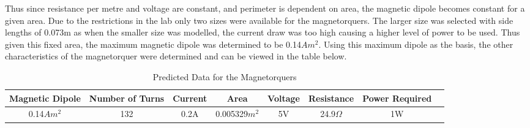 Thus since resistance per metre and voltage are constant, and perimeter is dependent on area, the magnetic dipole becomes constant for a given area.  Due to the restrictions in the lab only two sizes were available for the magnetorquers. The larger size was selected with side lengths of 0.073m as when the smaller size was modelled, the current draw was too high causing a higher level of power to be used.  Thus given this fixed area, the maximum magnetic dipole was determined to be  0.14$Am^2$.  Using this maximum dipole as the basis, the other characteristics of the magnetorquer were determined and can be viewed in the table below.
\begin{table}[H]
    \begin{center}
        \caption{Predicted Data for the Magnetorquers}
        \begin{tabular}{|c|c|c|c|c|c|c|c|}
            \hline
            Magnetic Dipole & Number of Turns & Current & Area & Voltage & Resistance & Power Required\\
            \hline
            0.14$Am^2$ & 132 & 0.2A & 0.005329$m^2$ & 5V & 24.9$\Omega$ & 1W\\
            \hline
        \end{tabular}
    \end{center}
    \vspace{-6mm}
\end{table}
